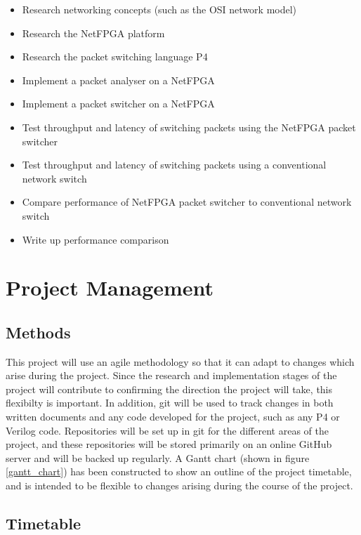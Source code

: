 \documentclass[12pt, a4paper, twoside, onecolumn]{article}
\begin{document}
\begin{itemize}
  \item Research networking concepts (such as the OSI network model)
  \item Research the NetFPGA platform \cite{NetFPGA}
  \item Research the packet switching language P4 \cite{P4}
  \item Implement a packet analyser on a NetFPGA
  \item Implement a packet switcher on a NetFPGA
  \item Test throughput and latency of switching packets using the NetFPGA packet switcher
  \item Test throughput and latency of switching packets using a conventional network switch
  \item Compare performance of NetFPGA packet switcher to conventional network switch
  \item Write up performance comparison
\end{itemize}

\section{Project Management}
\label{project_management}

\subsection{Methods}
\label{methods}
This project will use an agile methodology so that it can adapt to changes which arise during the project. Since the research and implementation stages of the project will contribute to confirming the direction the project will take, this flexibilty is important. In addition, git \cite{git} will be used to track changes in both written documents and any code developed for the project, such as any P4 or Verilog code. Repositories will be set up in git for the different areas of the project, and these repositories will be stored primarily on an online GitHub \cite{github} server and will be backed up regularly. A Gantt chart (shown in figure \ref{gantt_chart}) has been constructed to show an outline of the project timetable, and is intended to be flexible to changes arising during the course of the project.

\subsection{Timetable}
\label{timetable}
\end{document}
